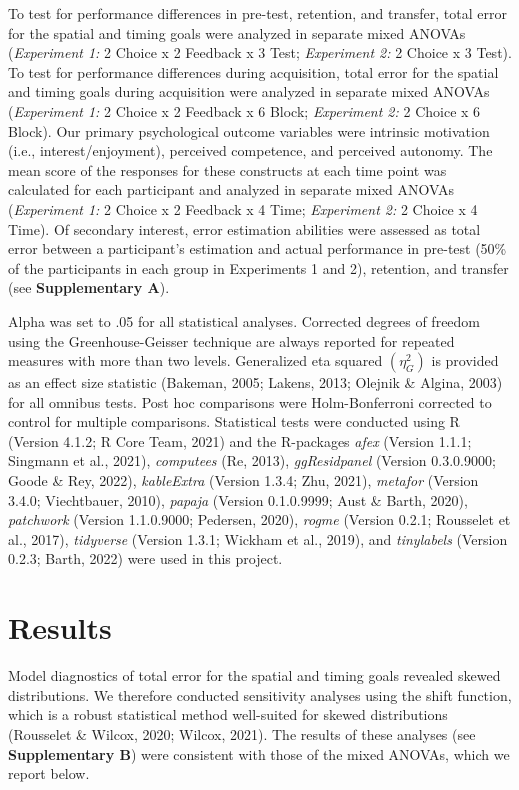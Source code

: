 \documentclass[
  doc, donotrepeattitle,floatsintext]{apa7}
\begin{document}
To test for performance differences in pre-test, retention, and transfer, total error for the spatial and timing goals were analyzed in separate mixed ANOVAs (\emph{Experiment 1:} 2 Choice x 2 Feedback x 3 Test; \emph{Experiment 2:} 2 Choice x 3 Test). To test for performance differences during acquisition, total error for the spatial and timing goals during acquisition were analyzed in separate mixed ANOVAs (\emph{Experiment 1:} 2 Choice x 2 Feedback x 6 Block; \emph{Experiment 2:} 2 Choice x 6 Block). Our primary psychological outcome variables were intrinsic motivation (i.e., interest/enjoyment), perceived competence, and perceived autonomy. The mean score of the responses for these constructs at each time point was calculated for each participant and analyzed in separate mixed ANOVAs (\emph{Experiment 1:} 2 Choice x 2 Feedback x 4 Time; \emph{Experiment 2:} 2 Choice x 4 Time). Of secondary interest, error estimation abilities were assessed as total error between a participant's estimation and actual performance in pre-test (50\% of the participants in each group in Experiments 1 and 2), retention, and transfer (see \textbf{Supplementary A}).

Alpha was set to .05 for all statistical analyses. Corrected degrees of freedom using the Greenhouse-Geisser technique are always reported for repeated measures with more than two levels. Generalized eta squared \((\eta_{G}^2)\) is provided as an effect size statistic (Bakeman, 2005; Lakens, 2013; Olejnik \& Algina, 2003) for all omnibus tests. Post hoc comparisons were Holm-Bonferroni corrected to control for multiple comparisons. Statistical tests were conducted using R (Version 4.1.2; R Core Team, 2021) and the R-packages \emph{afex} (Version 1.1.1; Singmann et al., 2021), \emph{computees} (Re, 2013), \emph{ggResidpanel} (Version 0.3.0.9000; Goode \& Rey, 2022), \emph{kableExtra} (Version 1.3.4; Zhu, 2021), \emph{metafor} (Version 3.4.0; Viechtbauer, 2010), \emph{papaja} (Version 0.1.0.9999; Aust \& Barth, 2020), \emph{patchwork} (Version 1.1.0.9000; Pedersen, 2020), \emph{rogme} (Version 0.2.1; Rousselet et al., 2017), \emph{tidyverse} (Version 1.3.1; Wickham et al., 2019), and \emph{tinylabels} (Version 0.2.3; Barth, 2022) were used in this project.

\hypertarget{results}{%
\section{Results}\label{results}}

Model diagnostics of total error for the spatial and timing goals revealed skewed distributions. We therefore conducted sensitivity analyses using the shift function, which is a robust statistical method well-suited for skewed distributions (Rousselet \& Wilcox, 2020; Wilcox, 2021). The results of these analyses (see \textbf{Supplementary B}) were consistent with those of the mixed ANOVAs, which we report below.
\end{document}
